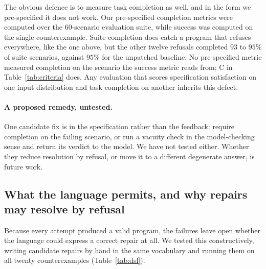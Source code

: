 \documentclass{article}
\begin{document}
The obvious defence is to measure task completion as well, and in the form we
pre-specified it does not work. Our pre-specified completion metrics were
computed over the 60-scenario evaluation suite, while success was computed on the
single counterexample. Suite completion does catch a program that refuses
everywhere, like the one above, but the other twelve refusals completed $93$ to
$95\%$ of suite scenarios, against $95\%$ for the unpatched baseline. No
pre-specified metric measured completion on the scenario the success metric
reads from; C in Table~\ref{tab:criteria} does. Any evaluation that scores
specification satisfaction on one input distribution and task completion on
another inherits this defect.

\paragraph{A proposed remedy, untested.} One candidate fix is in the specification
rather than the feedback: require completion on the failing scenario, or run a
vacuity check in the model-checking sense and return its verdict to the model.
We have not tested either. Whether they reduce resolution by refusal, or move it
to a different degenerate answer, is future work.

\subsection{What the language permits, and why repairs may resolve by refusal}
\label{sec:dsl}

Because every attempt produced a valid program, the failures leave open whether
the language could express a correct repair at all. We tested this
constructively, writing candidate repairs by hand in the same vocabulary and
running them on all twenty counterexamples (Table~\ref{tab:dsl}).
\end{document}
